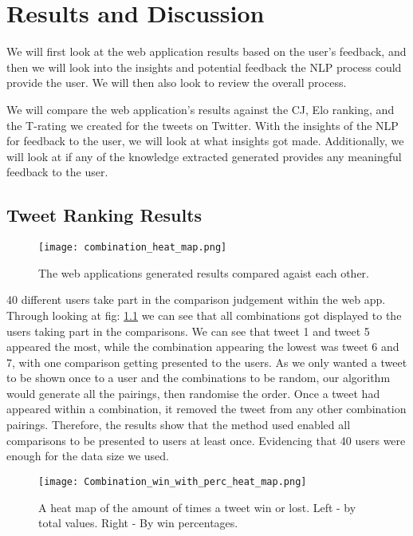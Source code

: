 \chapter{Results and Discussion}
\label{chap:results}

We will first look at the web application results based on the user's feedback, and then we will look into the insights and potential feedback the NLP process could provide the user. We will then also look to review the overall process. 

We will compare the web application's results against the CJ, Elo ranking, and the T-rating we created for the tweets on Twitter. With the insights of the NLP for feedback to the user, we will look at what insights got made. Additionally, we will look at if any of the knowledge extracted generated provides any meaningful feedback to the user.



\section{Tweet Ranking Results} 
\label{sec:reaults_ranking}

	\begin{figure}[h]
		\centering
		\texttt{[image: combination\_heat\_map.png]}
		\caption{The web applications generated results compared agaist each other.}
		\label{fig:combinations}
		
	\end{figure}
	
	40 different users take part in the comparison judgement within the web app. Through looking at fig: \ref{fig:combinations} we can see that all combinations got displayed to the users taking part in the comparisons. We can see that tweet 1 and tweet 5 appeared the most, while the combination appearing the lowest was tweet 6 and 7, with one comparison getting presented to the users. As we only wanted a tweet to be shown once to a user and the combinations to be random, our algorithm would generate all the pairings, then randomise the order. Once a tweet had appeared within a combination, it removed the tweet from any other combination pairings. Therefore, the results show that the method used enabled all comparisons to be presented to users at least once. Evidencing that 40 users were enough for the data size we used.
	
	\begin{figure}[t]
		\centering
		\texttt{[image: Combination\_win\_with\_perc\_heat\_map.png]}
		\caption{A heat map of the amount of times a tweet win or lost. Left - by total values. Right - By win percentages.}
		\label{fig:Combination_win_with_perc_heat_map}
		
	\end{figure}
	
